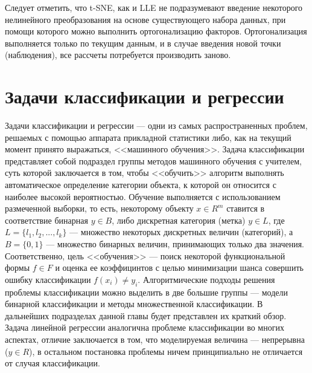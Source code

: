 \documentclass[runningheads]{llncs}
\begin{document}
Следует отметить, что t-SNE, как и LLE не подразумевают введение некоторого нелинейного преобразования на основе существующего набора данных, при помощи которого можно выполнить ортогонализацию факторов. Ортогонализация выполняется только по текущим данным, и в случае введения новой точки (наблюдения), все рассчеты потребуется производить заново.


\section*{Задачи классификации и регрессии}
\hspace{0.4cm}
Задачи классификации и регрессии — одни из самых распространенных проблем, решаемых с помощью аппарата прикладной статистики либо, как на текущий момент принято выражаться, <<машинного обучения>>. Задача классификации представляет собой подраздел группы методов машинного обучения с учителем, суть которой заключается в том, чтобы <<обучить>> алгоритм выполнять автоматическое определение категории объекта, к которой он относится с наиболее высокой вероятностью. Обучение выполняется с использованием размеченной выборки, то есть, некоторому объекту $x \in R^m$ ставится в соответствие бинарная $y \in B$, либо дискретная категория (метка) $y \in L$, где $L = \{l_1, l_2, ..., l_k\}$ — множество некоторых дискретных величин (категорий), а $B = \{0, 1\}$ — множество бинарных величин, принимающих только два значения. Соответственно, цель <<обучения>> — поиск некоторой функциональной формы $f \in F$ и оценка ее коэффицинтов с целью минимизации шанса совершить ошибку классификации $f(x_i) \neq y_i$. Алгоритмические подходы решения проблемы классификации можно выделить в две большие группы — модели бинарной классификации и методы множественной классификации. В дальнейших подразделах данной главы будет представлен их краткий обзор. Задача линейной регрессии аналогична проблеме классификации во многих аспектах, отличие заключается в том, что моделируемая величина — непрерывна ($y \in R$), в остальном постановка проблемы ничем принципиально не отличается от случая классификации.
\end{document}

